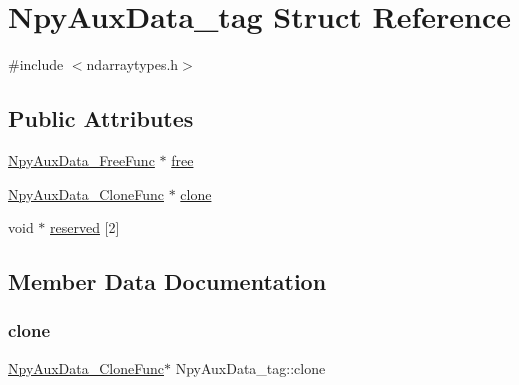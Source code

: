 \hypertarget{structNpyAuxData__tag}{}\section{Npy\+Aux\+Data\+\_\+tag Struct Reference}
\label{structNpyAuxData__tag}


{\ttfamily \#include $<$ndarraytypes.\+h$>$}

\subsection*{Public Attributes}
\begin{DoxyCompactItemize}
\item 
\hyperlink{ndarraytypes_8h_a970fa0aaefc33b0807c11adedcdae522}{Npy\+Aux\+Data\+\_\+\+Free\+Func} $\ast$ \hyperlink{structNpyAuxData__tag_a48430e8be4a5ecc7d1dd99071358e498}{free}
\item 
\hyperlink{ndarraytypes_8h_ace4e906efd432534ead8fdaff21b58e7}{Npy\+Aux\+Data\+\_\+\+Clone\+Func} $\ast$ \hyperlink{structNpyAuxData__tag_afd94a18b81c7834a4dc19a58b009ffe0}{clone}
\item 
void $\ast$ \hyperlink{structNpyAuxData__tag_a4abc038126e9770368d8ac88df8571d0}{reserved} \mbox{[}2\mbox{]}
\end{DoxyCompactItemize}


\subsection{Member Data Documentation}
\mbox{\label{structNpyAuxData__tag_afd94a18b81c7834a4dc19a58b009ffe0}} 
\subsubsection{\texorpdfstring{clone}{clone}}
{\footnotesize\ttfamily \hyperlink{ndarraytypes_8h_ace4e906efd432534ead8fdaff21b58e7}{Npy\+Aux\+Data\+\_\+\+Clone\+Func}$\ast$ Npy\+Aux\+Data\+\_\+tag\+::clone}

\mbox{\label{structNpyAuxData__tag_a48430e8be4a5ecc7d1dd99071358e498}} 
